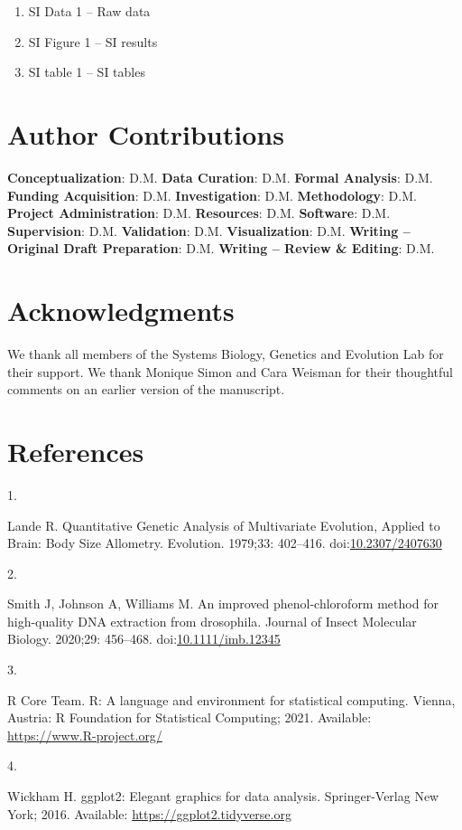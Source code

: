 \documentclass[
]{article}
\newlength{\cslhangindent}
\newlength{\csllabelwidth}
\newenvironment{CSLReferences}[2] %
 {\begin{list}{}{%
  \setlength{\itemindent}{0pt}
  \setlength{\leftmargin}{0pt}
  \setlength{\parsep}{0pt}
  \ifodd #1
   \setlength{\leftmargin}{\cslhangindent}
   \setlength{\itemindent}{-1\cslhangindent}
  \fi
  \setlength{\itemsep}{#2\baselineskip}}}
 {\end{list}}
\newcommand{\CSLLeftMargin}[1]{\parbox[t]{\csllabelwidth}{\strut#1\strut}}
\newcommand{\CSLRightInline}[1]{\parbox[t]{\linewidth - \csllabelwidth}{\strut#1\strut}}
\begin{document}
\begin{enumerate}
\def\labelenumi{\arabic{enumi}.}
\item
  SI Data 1 -- Raw data
\item
  SI Figure 1 -- SI results
\item
  SI table 1 -- SI tables
\end{enumerate}

\section{Author Contributions}\label{author-contributions}

\textbf{Conceptualization}: D.M. \textbf{Data Curation}: D.M.
\textbf{Formal Analysis}: D.M. \textbf{Funding Acquisition}: D.M.
\textbf{Investigation}: D.M. \textbf{Methodology}: D.M. \textbf{Project
Administration}: D.M. \textbf{Resources}: D.M. \textbf{Software}: D.M.
\textbf{Supervision}: D.M. \textbf{Validation}: D.M.
\textbf{Visualization}: D.M. \textbf{Writing -- Original Draft
Preparation}: D.M. \textbf{Writing -- Review \& Editing}: D.M.

\section{Acknowledgments}\label{acknowledgments}

We thank all members of the Systems Biology, Genetics and Evolution Lab
for their support. We thank Monique Simon and Cara Weisman for their
thoughtful comments on an earlier version of the manuscript.

\section*{References}\label{references}

\label{refs}
\begin{CSLReferences}{0}{1}
\CSLLeftMargin{1. }%
\CSLRightInline{Lande R. {Quantitative Genetic Analysis of Multivariate
Evolution, Applied to Brain: Body Size Allometry}. Evolution. 1979;33:
402--416. doi:\href{https://doi.org/10.2307/2407630}{10.2307/2407630}}

\CSLLeftMargin{2. }%
\CSLRightInline{Smith J, Johnson A, Williams M. An improved
phenol-chloroform method for high-quality DNA extraction from
drosophila. Journal of Insect Molecular Biology. 2020;29: 456--468.
doi:\href{https://doi.org/10.1111/imb.12345}{10.1111/imb.12345}}

\CSLLeftMargin{3. }%
\CSLRightInline{R Core Team. R: A language and environment for
statistical computing. Vienna, Austria: R Foundation for Statistical
Computing; 2021. Available: \url{https://www.R-project.org/}}

\CSLLeftMargin{4. }%
\CSLRightInline{Wickham H. ggplot2: Elegant graphics for data analysis.
Springer-Verlag New York; 2016. Available:
\url{https://ggplot2.tidyverse.org}}

\end{CSLReferences}
\end{document}
